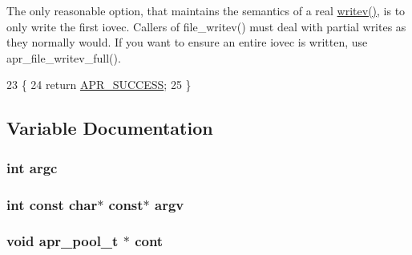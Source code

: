 The only reasonable option, that maintains the semantics of a real \hyperlink{apr__arch__os2calls_8h_a3d0f3996136a9b5ab46431c60c746efd}{writev()}, is to only write the first iovec. Callers of file\+\_\+writev() must deal with partial writes as they normally would. If you want to ensure an entire iovec is written, use apr\+\_\+file\+\_\+writev\+\_\+full().
\begin{DoxyCode}
23 \{
24     \textcolor{keywordflow}{return} \hyperlink{group__apr__errno_ga9ee311b7bf1c691dc521d721339ee2a6}{APR\_SUCCESS};
25 \}
\end{DoxyCode}


\subsection{Variable Documentation}
\subsubsection[{\texorpdfstring{argc}{argc}}]{ {\bf int} argc}\hypertarget{group__apr__getopt_ga6bdebf9385dc069c90aa21989641be02}{}\label{group__apr__getopt_ga6bdebf9385dc069c90aa21989641be02}
\subsubsection[{\texorpdfstring{argv}{argv}}]{ {\bf int} const char$\ast$ const$\ast$ argv}\hypertarget{group__apr__getopt_ga675a108e956f4e2ea74dae8d26e6273e}{}\label{group__apr__getopt_ga675a108e956f4e2ea74dae8d26e6273e}
\subsubsection[{\texorpdfstring{cont}{cont}}]{ {\bf void} {\bf apr\+\_\+pool\+\_\+t} $\ast$ cont}\hypertarget{group__apr__getopt_gadb9070ef05a170aebb3bab70465af9ac}{}\label{group__apr__getopt_gadb9070ef05a170aebb3bab70465af9ac}
